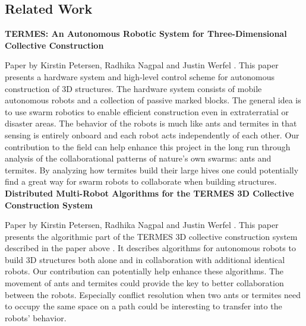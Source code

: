 
\subsection{Related Work}

\noindent \textbf{TERMES: An Autonomous Robotic System for Three-Dimensional Collective Construction} \par

Paper by Kirstin Petersen, Radhika Nagpal and Justin Werfel \cite{termes1}. This paper presents a hardware system and high-level control scheme for autonomous construction of 3D structures. The hardware system consists of mobile autonomous robots and a collection of passive marked blocks. The general idea is to use swarm robotics to enable efficient construction even in extraterratial or disaster areas. The behavior of the robots is much like ants and termites in that sensing is entirely onboard and each robot acts independently of each other. Our contribution to the field can help enhance this project in the long run through analysis of the collaborational patterns of nature's own swarms: ants and termites. By analyzing how termites build their large hives one could potentially find a great way for swarm robots to collaborate when building structures. \\

\noindent \textbf{Distributed Multi-Robot Algorithms for the TERMES 3D Collective Construction System } \par

Paper by Kirstin Petersen, Radhika Nagpal and Justin Werfel \cite{termes2}. This paper presents the algorithmic part of the TERMES 3D collective construction system described in the paper above \cite{termes1}. It describes algorithms for autonomous robots to build 3D structures both alone and in collaboration with additional identical robots. Our contribution can potentially help enhance these algorithms. The movement of ants and termites could provide the key to better collaboration between the robots. Especially conflict resolution when two ants or termites need to occupy the same space on a path could be interesting to transfer into the robots' behavior.
